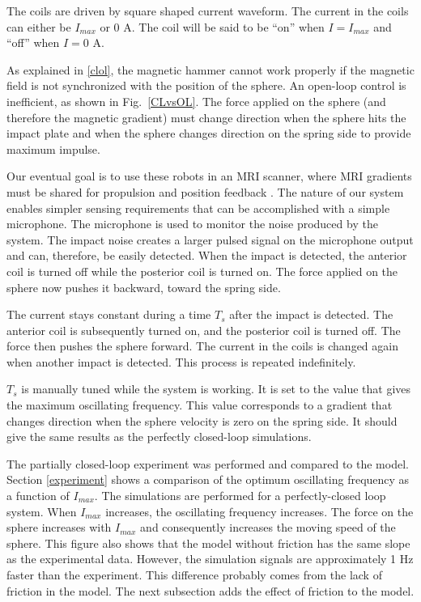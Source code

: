 \documentclass[letterpaper, 10 pt, conference]{ieeeconf}  %
\begin{document}
The coils are driven by square shaped current waveform. 
The current in the coils can either be $I_{max}$ or 0 A. 
The coil will be said to be ``on'' when $I=I_{max}$ and ``off'' when $I=0$ A.\par
As explained in \cref{clol}, the magnetic hammer cannot work properly if the magnetic field is not synchronized with the position of the sphere.
 An open-loop control is inefficient, as shown in Fig.~\ref{CLvsOL}.
  The force applied on the sphere (and therefore the magnetic gradient) must change direction when the sphere hits the impact plate and when the sphere changes direction on the spring side to provide maximum impulse.\par
Our eventual goal is to use these robots in an MRI scanner, where MRI gradients must be shared for propulsion and position feedback \cite{578}. 
The nature of our system enables simpler sensing requirements that can be accomplished with a simple microphone. 
The microphone is used to monitor the noise produced by the system. 
The impact noise creates a larger pulsed signal on the microphone output and can, therefore, be easily detected. 
When the impact is detected, the anterior coil is turned off while the posterior coil is turned on. 
The force applied on the sphere now pushes it backward, toward the spring side.\par
The current stays constant during a time $T_s$ after the impact is detected. 
The anterior coil is subsequently turned on, and the posterior coil is turned off. 
The force then pushes the sphere forward. The current in the coils is changed again when another impact is detected. 
This process is repeated indefinitely.\par
$T_s$ is manually tuned while the system is working. 
It is set to the value that gives the maximum oscillating frequency. 
This value corresponds to a gradient that changes direction when the sphere velocity is zero on the spring side. 
It should give the same results as the perfectly closed-loop simulations.\par
The partially closed-loop experiment was performed and compared to the model. 
Section \ref{experiment} shows a comparison of the optimum oscillating frequency as a function of $I_{max}$. 
The simulations are performed for a perfectly-closed loop system. 
When $I_{max}$ increases, the oscillating frequency increases. 
The force on the sphere  increases with $I_{max}$ and consequently increases the moving speed of the sphere.
This figure also shows that the model without friction has the same slope as the experimental data. 
However, the simulation signals are approximately 1 Hz faster than the experiment. 
This difference probably comes from the lack of friction in the model. 
The next subsection adds the effect of friction to the model.
\end{document}
